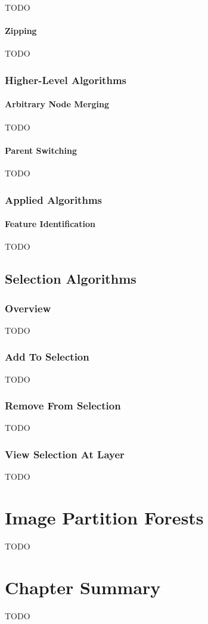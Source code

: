 TODO

\paragraph{Zipping}

TODO

\subsubsection{Higher-Level Algorithms}

\paragraph{Arbitrary Node Merging}

TODO

\paragraph{Parent Switching}

TODO

\subsubsection{Applied Algorithms}

\paragraph{Feature Identification}

TODO

\subsection{Selection Algorithms}

\subsubsection{Overview}

TODO

\subsubsection{Add To Selection}

TODO

\subsubsection{Remove From Selection}

TODO

\subsubsection{View Selection At Layer}

TODO

\section{Image Partition Forests}

TODO

\section{Chapter Summary}

TODO
